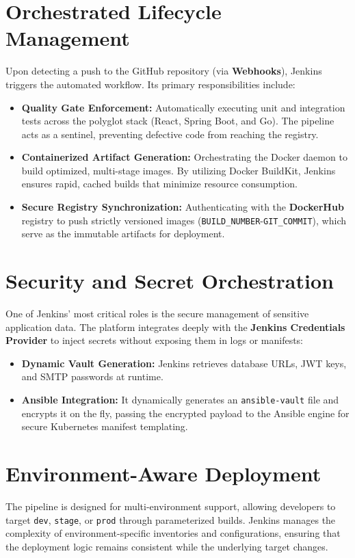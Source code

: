 \documentclass[12pt,a4paper]{report}
\begin{document}
\section{Orchestrated Lifecycle Management}
Upon detecting a push to the GitHub repository (via \textbf{Webhooks}), Jenkins triggers the automated workflow. Its primary responsibilities include:
\begin{itemize}
    \item \textbf{Quality Gate Enforcement:} Automatically executing unit and integration tests across the polyglot stack (React, Spring Boot, and Go). The pipeline acts as a sentinel, preventing defective code from reaching the registry.
    \item \textbf{Containerized Artifact Generation:} Orchestrating the Docker daemon to build optimized, multi-stage images. By utilizing Docker BuildKit, Jenkins ensures rapid, cached builds that minimize resource consumption.
    \item \textbf{Secure Registry Synchronization:} Authenticating with the \textbf{DockerHub} registry to push strictly versioned images (\texttt{BUILD\_NUMBER}-\texttt{GIT\_COMMIT}), which serve as the immutable artifacts for deployment.
\end{itemize}

\section{Security and Secret Orchestration}
One of Jenkins' most critical roles is the secure management of sensitive application data. The platform integrates deeply with the \textbf{Jenkins Credentials Provider} to inject secrets without exposing them in logs or manifests:
\begin{itemize}
    \item \textbf{Dynamic Vault Generation:} Jenkins retrieves database URLs, JWT keys, and SMTP passwords at runtime.
    \item \textbf{Ansible Integration:} It dynamically generates an \texttt{ansible-vault} file and encrypts it on the fly, passing the encrypted payload to the Ansible engine for secure Kubernetes manifest templating.
\end{itemize}

\section{Environment-Aware Deployment}
The pipeline is designed for multi-environment support, allowing developers to target \texttt{dev}, \texttt{stage}, or \texttt{prod} through parameterized builds. Jenkins manages the complexity of environment-specific inventories and configurations, ensuring that the deployment logic remains consistent while the underlying target changes.
\end{document}
